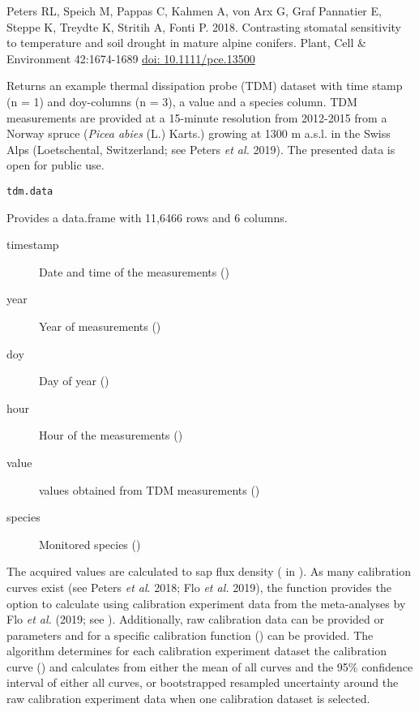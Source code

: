 \documentclass[a4paper]{book}
\begin{document}
%
\begin{References}\relax
Peters RL, Speich M, Pappas C, Kahmen A, von Arx G, Graf Pannatier E, Steppe K, Treydte K, Stritih A, Fonti P. 2018.
Contrasting stomatal sensitivity to temperature and soil drought in mature alpine conifers.
Plant, Cell \& Environment 42:1674-1689 \url{doi: 10.1111/pce.13500}
\end{References}
%
\begin{Description}\relax
Returns an example thermal dissipation probe (TDM)
dataset with time stamp (n = 1) and doy-columns (n = 3), a value and a species column.
TDM  measurements are provided at a 15-minute resolution from 2012-2015 from
a Norway spruce (\emph{Picea abies} (L.) Karts.) growing at 1300 m a.s.l.
in the Swiss Alps (Loetschental, Switzerland; see Peters \emph{et al.} 2019).
The presented data is open for public use.
\end{Description}
%
\begin{Usage}
\begin{verbatim}
tdm.data
\end{verbatim}
\end{Usage}
%
\begin{Format}
Provides a data.frame with 11,6466  rows and 6 columns.
\begin{description}

\item[timestamp ] Date and time of the measurements ()
\item[year] Year of measurements ()
\item[doy] Day of year ()
\item[hour] Hour of the measurements ()
\item[value]  values obtained from TDM measurements ()
\item[species] Monitored species ()

\end{description}
\end{Format}
%
\begin{Description}\relax
The acquired  values are calculated to sap flux density
( in ). As many calibration curves exist
(see Peters \emph{et al}. 2018; Flo \emph{et al.} 2019), the function provides the option to
calculate  using calibration experiment data from the meta-analyses by
Flo \emph{et al.} (2019; see ). Additionally,
raw calibration data can be provided or parameters  and 
for a specific calibration function () can be provided.
The algorithm determines for each calibration experiment dataset
the calibration curve () and calculates  from
either the mean of all curves and the 95\% confidence interval
of either all curves, or bootstrapped resampled uncertainty around
the raw calibration experiment data when one calibration dataset is selected.
\end{Description}
\end{document}
